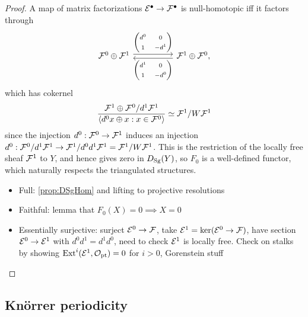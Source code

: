 \begin{proof}
    A map of matrix factorizations $\mathcal{E}^\bullet\to\mathcal{F}^\bullet$ is
    null-homotopic iff it factors through
    \begin{equation*}
        \begin{tikzcd}[ampersand replacement=\&,column sep=huge]
            \calF^0\oplus\calF^1 \ar[shift left]{r}{\begin{pmatrix}
                    d^0 & 0 \\ 1 & -d^1
            \end{pmatrix}} \&
            \calF^1\oplus\calF^0, \ar[shift left]{l}{\begin{pmatrix}
                    d^1 & 0 \\ 1 & -d^0
            \end{pmatrix}}
        \end{tikzcd}
    \end{equation*}
    which has cokernel
    \begin{equation*}
        \frac{\mathcal{F}^1\oplus\mathcal{F}^0/d^1\mathcal{F}^1}
            {\langle d^0x\oplus x : x\in\mathcal{F}^0\rangle}
            \simeq \mathcal{F}^1/W\mathcal{F}^1
    \end{equation*}
    since the injection $d^0:\mathcal{F}^0\to\mathcal{F}^1$ induces an injection
    $d^0:\mathcal{F}^0/d^1\mathcal{F}^1\to\mathcal{F}^1/d^0d^1\mathcal{F}^1=\mathcal{F}^1/W\mathcal{F}^1$. This is
    the restriction of the locally free sheaf $\mathcal{F}^1$ to $Y$, and hence gives
    zero in $D_{\mathrm{Sg}}(Y)$, so $F_0$ is a well-defined functor, which naturally
    respects the triangulated structures.


    \begin{itemize}
        \item Full: \ref{prop:DSgHom} and lifting to projective resolutions
        \item Faithful: lemma that $F_0(X)=0\implies X=0$
        \item Essentially surjective: surject $\mathcal{E}^0\to\mathcal{F}$, take
            $\mathcal{E}^1=\ker(\mathcal{E}^0\to\mathcal{F})$, have section $\mathcal{E}^0\to\mathcal{E}^1$
            with $d^0d^1=d^1d^0$, need to check $\mathcal{E}^1$ is locally free. Check
            on stalks by showing $\operatorname{Ext}^i(\mathcal{E}^1,\mathcal{O}_{\mathrm{pt}})=0$ for $i>0$, Gorenstein
            stuff
    \end{itemize}
\end{proof}

\subsection{Kn\"orrer periodicity}

